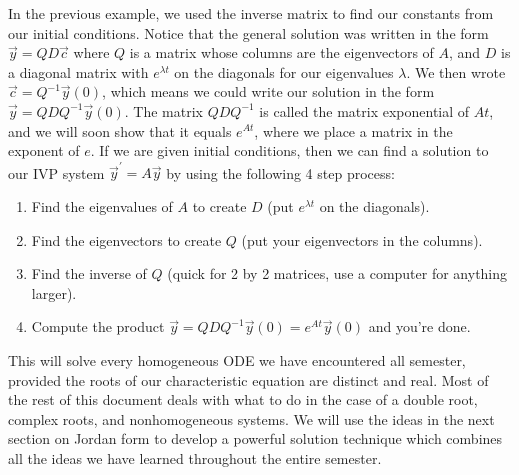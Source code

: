 In the previous example, we used the inverse matrix to find our constants from our initial conditions.  Notice that the general solution was written in the form $\vec y = QD\vec c$ where $Q$ is a matrix whose columns are the eigenvectors of $A$, and $D$ is a diagonal matrix with $e^{\lambda t}$ on the diagonals for our eigenvalues $\lambda$.  We then wrote $\vec c = Q^{-1}\vec y(0)$, which means we could write our solution in the form 
$\vec y = QDQ^{-1}\vec y(0)$. The matrix $QDQ^{-1}$ is called the matrix exponential of $At$, and we will soon show that it equals $e^{At}$, where we place a matrix in the exponent of $e$. If we are given initial conditions, then we can find a solution to our IVP system $\vec y^\prime = A\vec y$ by using the following 4 step process: 
\begin{enumerate}
	\item Find the eigenvalues of $A$ to create $D$ (put $e^{\lambda t}$ on the diagonals).
	\item Find the eigenvectors to create $Q$ (put your eigenvectors in the columns).
	\item Find the inverse of $Q$ (quick for 2 by 2 matrices, use a computer for anything larger).
	\item Compute the product $\vec y = QDQ^{-1}\vec y(0) = e^{At}\vec y(0)$ and you're done. 
\end{enumerate}
This will solve every homogeneous ODE we have encountered all semester, provided the roots of our characteristic equation are distinct and real. Most of the rest of this document deals with what to do in the case of a double root, complex roots, and nonhomogeneous systems. We will use the ideas in the next section on Jordan form to develop a powerful solution technique which combines all the ideas we have learned throughout the entire semester.  



